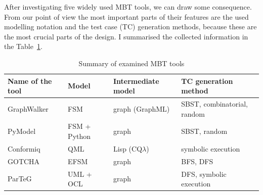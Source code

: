 After investigating five widely used MBT tools, we can draw some consequence. From our point of view the most important parts of their features are the used modelling notation and the test case (TC) generation methods, because these are the most crucial parts of the design. I summarised the collected information in the Table~\ref{tab:toolssummary}.

\begin{table}[htb]
\begin{center}
\begin{tabular}{llll}\toprule
	\textbf{Name of the tool} & \textbf{Model} & \textbf{Intermediate model} & \textbf{TC generation method}\\\midrule
	GraphWalker & FSM & graph (GraphML) & SBST, combinatorial, random\\
	PyModel & FSM + Python & graph & SBST, random\\
	Conformiq & QML & Lisp (CQ$\lambda$) & symbolic execution\\
	GOTCHA & EFSM & graph & BFS, DFS\\
	ParTeG & UML + OCL & graph & DFS, symbolic execution\\
\bottomrule
\end{tabular}
\end{center}
\caption{\label{tab:toolssummary} Summary of examined MBT tools}
\end{table}

